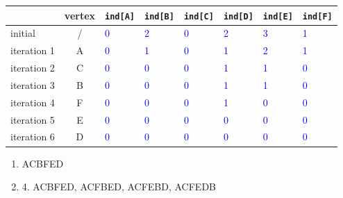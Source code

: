 \begin{table}[htbp]
    \begin{center}
        \begin{tabular}{|l|c|l|l|l|l|l|l|}
            \hline
                        & vertex & \texttt{ind[A]}     & \texttt{ind[B]}     & \texttt{ind[C]}     & \texttt{ind[D]}     & \texttt{ind[E]}     & \texttt{ind[F]}     \\ \hline
            initial     & /      & \textcolor{blue}{0} & \textcolor{blue}{2} & \textcolor{blue}{0} & \textcolor{blue}{2} & \textcolor{blue}{3} & \textcolor{blue}{1} \\ \hline
            iteration 1 & A      & \textcolor{blue}{0} & \textcolor{blue}{1} & \textcolor{blue}{0} & \textcolor{blue}{1} & \textcolor{blue}{2} & \textcolor{blue}{1} \\ \hline
            iteration 2 & C      & \textcolor{blue}{0} & \textcolor{blue}{0} & \textcolor{blue}{0} & \textcolor{blue}{1} & \textcolor{blue}{1} & \textcolor{blue}{0} \\ \hline
            iteration 3 & B      & \textcolor{blue}{0} & \textcolor{blue}{0} & \textcolor{blue}{0} & \textcolor{blue}{1} & \textcolor{blue}{1} & \textcolor{blue}{0} \\ \hline
            iteration 4 & F      & \textcolor{blue}{0} & \textcolor{blue}{0} & \textcolor{blue}{0} & \textcolor{blue}{1} & \textcolor{blue}{0} & \textcolor{blue}{0} \\ \hline
            iteration 5 & E      & \textcolor{blue}{0} & \textcolor{blue}{0} & \textcolor{blue}{0} & \textcolor{blue}{0} & \textcolor{blue}{0} & \textcolor{blue}{0} \\ \hline
            iteration 6 & D      & \textcolor{blue}{0} & \textcolor{blue}{0} & \textcolor{blue}{0} & \textcolor{blue}{0} & \textcolor{blue}{0} & \textcolor{blue}{0} \\ \hline
        \end{tabular}
    \end{center}\label{tab:Topological_Sort_Answer}
\end{table}
\vspace{0.5cm}




\begin{solution}
    \begin{enumerate}
        \item ACBFED
        \item 4. ACBFED, ACFBED, ACFEBD, ACFEDB
    \end{enumerate}
\end{solution}